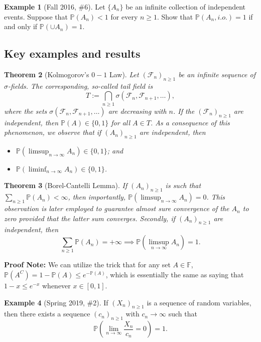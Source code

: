 \documentclass[12pt,reqno]{article}
\renewcommand{\emph}[1]{\textit{#1}}
\theoremstyle{plain}
\newtheorem{theorem}{Theorem}[section]
\theoremstyle{definition}
\newtheorem{example}[theorem]{Example}
\newcommand{\PP}[1]{\ensuremath{\mathbb{P}\left(#1\right)}}
\begin{document}
\begin{example}[Fall 2016, \#6]
Let $\{A_n\}$ be an infinite collection of independent events. 
Suppose that $\PP{A_n} < 1$ for every $n \geq 1$. Show that 
$\PP{A_n, i.o.} = 1$ if and only if $\PP{\cup A_n} = 1$. 
\end{example} 

\subsection{Key examples and results} 

\begin{theorem}[Kolmogorov's $0-1$ Law] 
Let $(\mathcal{F}_n)_{n \geq 1}$ be an infinite sequence of $\sigma$-fields. The corresponding, 
so-called \emph{tail field} is 
\[
T := \bigcap_{n \geq 1} \sigma(\mathcal{F}_n, \mathcal{F}_{n+1}, \ldots), 
\]
where the sets $\sigma(\mathcal{F}_n, \mathcal{F}_{n+1}, \ldots)$ are decreasing with $n$. 
If the $(\mathcal{F}_n)_{n \geq 1}$ are independent, then $\PP{A} \in \{0,1\}$ for all 
$A \in T$. 
As a consequence of this phenomenon, we observe that if $(A_n)_{n \geq 1}$ are independent, then 
\begin{itemize} 

\item[(1)] $\PP{\limsup_{n \rightarrow \infty} A_n} \in \{0,1\}$; and 
\item[(2)] $\PP{\liminf_{n \rightarrow \infty} A_n} \in \{0,1\}$. 

\end{itemize} 
\end{theorem} 

\begin{theorem}[Borel-Cantelli Lemma] 
If $(A_n)_{n \geq 1}$ is such that $\sum_{n \geq 1} \PP{A_n} < \infty$, then 
importantly, $\PP{\limsup_{n \rightarrow \infty} A_n} = 0$. This observation 
is later employed to guarantee almost sure convergence of the $A_n$ to zero 
provided that the latter sum converges. Secondly, if $(A_n)_{n \geq 1}$ are 
independent, then 
\[
\sum_{n \geq 1} \PP{A_n} = +\infty \implies \PP{\limsup_{n \rightarrow \infty} A_n} = 1. 
\]
\end{theorem} 

\noindent 
\textbf{Proof Note:} We can utilize the trick that for any set $A \in \mathbb{F}$, 
$\PP{A^C} = 1 - \PP{A} \leq e^{-\PP{A}}$, which is essentially the same as 
saying that $1-x \leq e^{-x}$ whenever $x \in [0, 1]$. 

\begin{example}[Spring 2019, \#2]
If $(X_n)_{n \geq 1}$ is a sequence of random variables, then there exists a 
sequence $(c_n)_{n \geq 1}$ with $c_n \rightarrow \infty$ such that 
\[
\PP{\lim_{n \rightarrow \infty} \frac{X_n}{c_n} = 0} = 1. 
\]
\end{example} 
\end{document}
